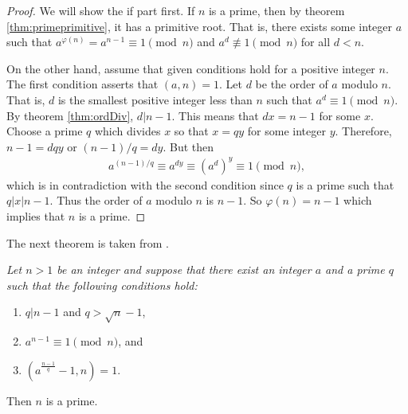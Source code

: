 \documentclass{subfiles}
\begin{document}
	\begin{proof}
		We will show the if part first. If $n$ is a prime, then by theorem \eqref{thm:primeprimitive}, it has a primitive root. That is, there exists some integer $a$ such that $a^{\varphi(n)} = a^{n-1} \equiv 1 \pmod n$ and $a^d \not \equiv 1 \pmod n$ for all $d<n$. 
		
		On the other hand, assume that given conditions hold for a positive integer $n$. The first condition asserts that $(a,n)=1$. Let $d$ be the order of $a$ modulo $n$. That is, $d$ is the smallest positive integer less than $n$ such that $a^d \equiv 1 \pmod n$. By theorem \eqref{thm:ordDiv}, $d|n-1$. This means that $dx = n-1$ for some $x$. Choose a prime $q$ which divides $x$ so that $x=qy$ for some integer $y$. Therefore, $n-1=dqy$ or $(n-1)/q=dy$. But then
		\begin{align*}
			a^{(n-1)/q} \equiv a^{dy} \equiv \left(a^d\right)^y \equiv 1 \pmod n,
		\end{align*}
		which is in contradiction with the second condition since $q$ is a prime such that $q|x|n-1$. Thus the order of $a$ modulo $n$ is $n-1$. So $\varphi(n)=n-1$ which implies that $n$ is a prime.
	\end{proof}	
	The next theorem is taken from \cite{Koblitz}.
	\begin{theorem}\slshape
		Let $n>1$ be an integer and suppose that there exist an integer $a$ and a prime $q$ such that the following conditions hold:
		\begin{enumerate}
			\item $q|n-1$ and $q > \sqrt n -1$,
			\item $a^{n-1} \equiv1\pmod n$, and
			\item $\left(a^{\frac{n-1}{q}}-1,n\right) = 1$.
		\end{enumerate}
		Then $n$ is a prime.
	\end{theorem}
	
\end{document}
